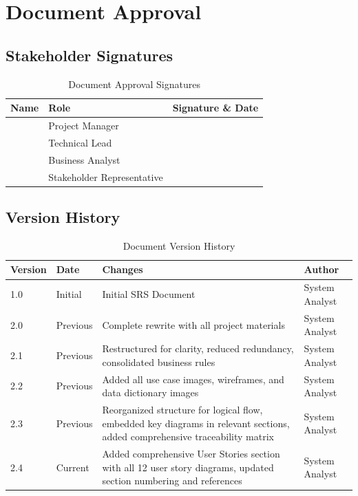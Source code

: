 \documentclass[12pt,a4paper]{article}
\begin{document}
\section{Document Approval}

\subsection{Stakeholder Signatures}
\begin{table}[H]
\centering
\begin{tabular}{|p{4cm}|p{4cm}|p{4cm}|}
\hline
\textbf{Name} & \textbf{Role} & \textbf{Signature \& Date} \\
\hline
 & Project Manager &  \\
\hline
 & Technical Lead &  \\
\hline
 & Business Analyst &  \\
\hline
 & Stakeholder Representative &  \\
\hline
\end{tabular}
\caption{Document Approval Signatures}
\end{table}

\subsection{Version History}
\begin{table}[H]
\centering
\begin{tabular}{|p{2cm}|p{3cm}|p{4cm}|p{3cm}|}
\hline
\textbf{Version} & \textbf{Date} & \textbf{Changes} & \textbf{Author} \\
\hline
1.0 & Initial & Initial SRS Document & System Analyst \\
\hline
2.0 & Previous & Complete rewrite with all project materials & System Analyst \\
\hline
2.1 & Previous & Restructured for clarity, reduced redundancy, consolidated business rules & System Analyst \\
\hline
2.2 & Previous & Added all use case images, wireframes, and data dictionary images & System Analyst \\
\hline
2.3 & Previous & Reorganized structure for logical flow, embedded key diagrams in relevant sections, added comprehensive traceability matrix & System Analyst \\
2.4 & Current & Added comprehensive User Stories section with all 12 user story diagrams, updated section numbering and references & System Analyst \\
\hline
\end{tabular}
\caption{Document Version History}
\end{table}
\end{document}
